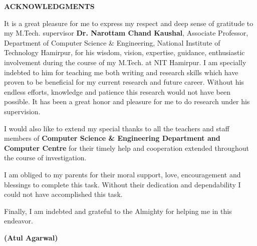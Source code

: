 \vspace{4.0\baselineskip}
\textbf{\hspace{2.5cm} \LARGE \textbf{ACKNOWLEDGMENTS}}

\vspace{15mm}
It is a great pleasure for me to express my respect and deep sense of gratitude to my M.Tech. supervisor \textbf{Dr. Narottam Chand Kaushal}, Associate Professor, Department of Computer Science \& Engineering, National Institute of Technology Hamirpur, for his wisdom, vision, expertise, guidance, enthusiastic involvement during the course of my M.Tech. at NIT Hamirpur. I am specially indebted to him for teaching me both writing and research skills which have proven to be beneficial for my current research and future career. Without his endless efforts, knowledge and patience this research would not have been possible. It has been a great honor and pleasure for me to do research under his supervision.\\
\par I would also like to extend my special thanks to all the teachers and staff members of \textbf{Computer Science \& Engineering Department and Computer Centre} for their timely help and cooperation extended throughout the course of investigation.\\

\par I am obliged to my parents for their moral support, love, encouragement and blessings to complete this task. Without their dedication and dependability I could not have accomplished this task.\\


\par Finally, I am indebted and grateful to the Almighty for helping me in this endeavor.\


\vspace{1.2cm}
\begin{flushright}
	\textbf{(Atul Agarwal)}
\end{flushright}

